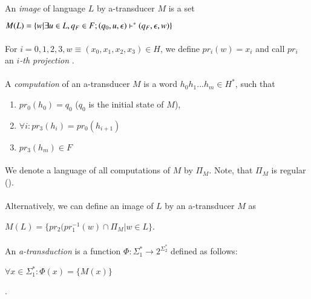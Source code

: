 \paragraph{}
 An \emph{image} of language $L$ by a-transducer $M$ is a set \\
\centerline{$M(L) = \{ w|\exists u \in L, q_{F} \in F; (q_{0}, u, \epsilon) \vdash^\ast (q_{F}, \epsilon, w) \} $}

\paragraph{}
 For $i=0,1,2,3, w \equiv (x_{0},x_{1},x_{2},x_{3}) \in H$, we define $pr_{i}(w) = x_{i}$ and call $pr_{i}$ an \emph{$i$-th projection} .

\paragraph{}
 A \emph{computation} of an a-transducer $M$ is a word $h_{0}h_{1}...h_{m} \in H^{*}$, such that
\begin{enumerate}
\item $pr_{0}(h_{0}) = q_{0}$ ($q_{0}$ is the initial state of $M$),
\item $\forall i: pr_{3}(h_{i}) = pr_{0}(h_{i+1})$
\item $pr_{3}(h_{m}) \in F$
\end{enumerate}

\paragraph{}
\oznacenie We denote a language of all computations of $M$ by $\Pi_{M}$. Note, that $\Pi_{M}$ is regular (\cite{gin:AATPFL}).

\paragraph{}
 Alternatively, we can define an image of $L$ by an a-transducer $M$ as \\
\centerline{$M(L) = \{ pr_{2}(pr_{1}^{-1}(w) \cap \Pi_{M} | w \in L \}$.}

\paragraph{}
 An \emph{a-transduction} is a function $\Phi : \Sigma_{1}^{*} \rightarrow 2^{\Sigma_{2}^{*}}$ defined as follows: \\
\centerline{$\forall x \in \Sigma_{1}^{*}: \Phi(x) = \{ M(x) \} $}.

